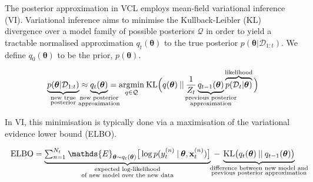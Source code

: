 \documentclass[a4paper,10pt]{article}
\let\boldtheta\theta %
\renewcommand{\theta}{\boldsymbol{\boldtheta}} %
\newcommand{\x}{\mathbf{x}}
\begin{document}
The posterior approximation in VCL employs mean-field variational inference (VI). Variational inference aims to minimise the Kullback-Leibler (KL) divergence over a model family of possible posteriors $\mathcal{Q}$ in order to yield a tractable normalised approximation $q_t(\theta)$ to the true posterior $p(\theta | \mathcal{D}_{1:t})$. We define $q_0(\theta)$ to be the prior, $p(\theta)$.

\vspace{-2.em}
\begin{equation}\label{eq:3}
\begin{split}
\underbrace{p(\theta | \mathcal{D}_{1:t})}_{\mathclap{\substack{\text{new true}\\ \text{posterior}}}}\approx \underbrace{q_t(\theta)}_{\mathclap{\substack{\text{new posterior}\\ \text{approximation}}}} &=\underset{q\in\mathcal{Q}}{\mathrm{arg}\mathrm{min}} \: \mathrm{KL}\Big(q(\theta)\:||\:\frac{1}{Z_t}\underbrace{q_{t-1}(\theta)}_{\mathclap{\substack{\text{previous posterior} \\ \text{approximation}}}}\overbrace{p(\mathcal{D}_t|\theta)}^{\mathclap{\text{likelihood}}} \Big)\\
\end{split}
\end{equation}

\vspace{-0.6em}
In VI, this minimisation is typically done via a maximisation of the variational evidence lower bound (ELBO). 

\vspace{-1.9em}
\begin{equation}\label{eq:4}
\begin{split}
\mathrm{ELBO}= \underbrace{{\textstyle\sum}_{n=1}^{N_t} \> \mathds{E}_{\theta \sim q_t(\theta)}\big[\log p(y_t^{(n)} \:| \:\theta, \x_t^{(n)})\big]}_{\substack{\text{expected log-likelihood}\\\text{of new model over the new data}}} \> -  \> \underbrace{\mathrm{KL}\big(q_t(\theta)\:||\:q_{t-1}(\theta)\big)}_{\mathclap{\substack{\text{difference between new model and}\\\text{previous posterior approximation}}}}
\end{split}
\end{equation} %
\end{document}
